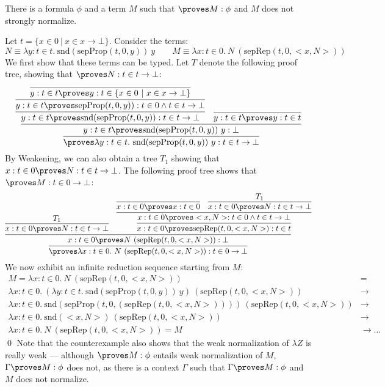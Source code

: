 \documentclass{LMCS}
\newcommand{\p}{\proves}
\newcommand{\g}{\Gamma}
\newcommand{\gp}{\Gamma \proves}
\newcommand{\pl}[1]{\ensuremath{\mathrm{#1}}}
\newcommand{\SND}{\pl{snd}}
\newcommand{\lz}{\lambda Z}
\begin{document}
\begin{thm}
There is a formula $\phi$ and a term $M$ such that $\p M : \phi$ and $M$
does not strongly normalize.
\end{thm}
\proof Let $t = \{ x \in 0\ |\ x \in x \to \bot \}$. Consider the terms:
\[
N \equiv \lambda y : t \in t.\ \SND(\pl{sepProp}(t, 0, y))\ y \qquad
M \equiv \lambda x : t \in 0.\ N\ (\pl{sepRep}(t, 0, <x, N>))
\]
We first show that these terms can be typed. Let $T$ denote the following proof tree, showing that 
$\p N : t \in t \to \bot$:
\[
\infer{\p \lambda y : t \in t.\ \SND(\pl{sepProp}(t, 0, y))\ y : t \in t \to \bot}
{
  \infer{y : t \in t \p \SND(\pl{sepProp}(t, 0, y))\ y : \bot}
  {
    \infer{y : t \in t \p \SND(\pl{sepProp}(t, 0, y)) : t \in t \to \bot}
    {
      \infer{y : t \in t \p \pl{sepProp}(t, 0, y)) : t \in 0 \land t \in t \to \bot}
      {
        \infer{y : t \in t \p y : t \in \{ x \in 0 \ | \ x \in x \to \bot \}}{}
      }
    }
    &
    \infer{y : t \in t \p y : t \in t}{}
  }
}
\]
By Weakening, we can also obtain a tree $T_1$ showing that $x : t \in
0 \p N : t \in t \to \bot$. The following proof tree shows that $\p M : t \in 0 \to \bot$:
\[
\infer{\p \lambda x : t \in 0.\ N\ (\pl{sepRep}(t, 0, <x, N>)) : t \in 0 \to \bot}
{
  \infer{x : t \in 0 \p N\ (\pl{sepRep}(t, 0, <x, N>)) : \bot}
  {
    \infer{x : t \in 0 \p N : t \in t \to \bot}{T_1}
    &
    \infer{x : t \in 0 \p \pl{sepRep}(t, 0, <x, N>) : t \in t}
    {
      \infer{x : t \in 0 \p <x, N> : t \in 0 \land t \in t \to \bot}
      {
        \infer{x : t \in 0 \p x : t \in 0}{}
        &
        \infer{x : t \in 0 \p N : t \in t \to \bot}{T_1}
      }
    }
  }
}
\]
We now exhibit an infinite reduction sequence starting from $M$:
\[
\begin{array}{ll}
M = \lambda x : t \in 0.\ N\ (\pl{sepRep}(t, 0, <x, N>)) & = \\
\lambda x : t \in 0.\ (\lambda y : t \in t.\ \SND(\pl{sepProp}(t, 0, y))\
y)\ (\pl{sepRep}(t, 0, <x, N>)) & \to\\
\lambda x : t \in 0.\ \SND(\pl{sepProp}(t, 0, (\pl{sepRep}(t, 0, <x, N>))))\
(\pl{sepRep}(t, 0, <x, N>)) & \to\\
\lambda x : t \in 0.\ \SND(<x, N>)\ (\pl{sepRep}(t, 0, <x, N>)) & \to \\
\lambda x : t \in 0.\ N\ (\pl{sepRep}(t, 0, <x, N>)) = M & \to {\ldots}
\end{array}
\]\qed
Note that the counterexample also shows that the weak
normalization of $\lz$ is really weak --- although $\p M : \phi$ entails weak 
normalization of $M$, $\gp M : \phi$ does not, as there is a context $\g$ such that 
$\gp M : \phi$ and $M$ does not normalize. 
\end{document}
